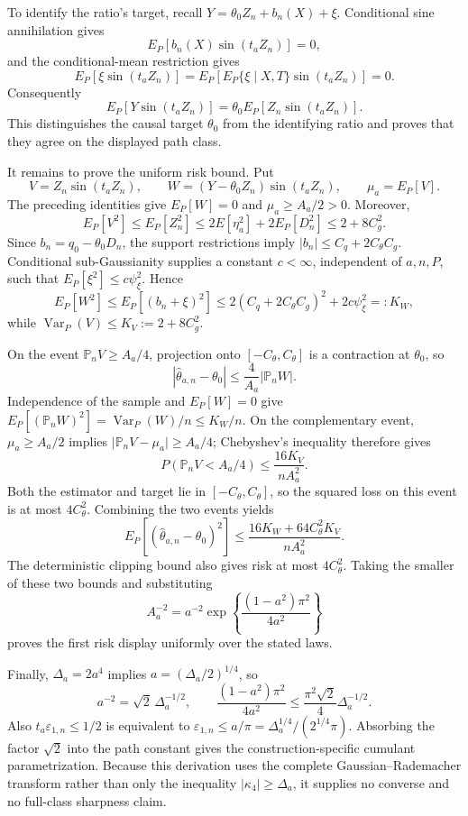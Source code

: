 To identify the ratio's target, recall \(Y=\theta_0Z_n+b_n(X)+\xi\).  Conditional sine annihilation gives
\[
 E_P[b_n(X)\sin(t_aZ_n)]=0,
\]
and the conditional-mean restriction gives
\[
 E_P[\xi\sin(t_aZ_n)]
 =E_P[E_P\{\xi\mid X,T\}\sin(t_aZ_n)]=0.
\]
Consequently
\[
 E_P[Y\sin(t_aZ_n)]
 =\theta_0E_P[Z_n\sin(t_aZ_n)].
\]
This distinguishes the causal target \(\theta_0\) from the identifying ratio and proves that they agree on the displayed path class.

It remains to prove the uniform risk bound.  Put
\[
 V=Z_n\sin(t_aZ_n),
 \qquad
 W=(Y-\theta_0Z_n)\sin(t_aZ_n),
 \qquad
 \mu_a=E_P[V].
\]
The preceding identities give \(E_P[W]=0\) and \(\mu_a\ge A_a/2>0\).  Moreover,
\[
 E_P[V^2]\le E_P[Z_n^2]
 \le2E[\eta_a^2]+2E_P[D_n^2]
 \le2+8C_g^2.
\]
Since \(b_n=q_0-\theta_0D_n\), the support restrictions imply \(\lvert b_n\rvert\le C_q+2C_{\theta}C_g\).  Conditional sub-Gaussianity supplies a constant \(c<\infty\), independent of \(a,n,P\), such that \(E_P[\xi^2]\le c\psi_{\xi}^2\).  Hence
\[
 E_P[W^2]
 \le E_P[(b_n+\xi)^2]
 \le2(C_q+2C_{\theta}C_g)^2+2c\psi_{\xi}^2=:K_W,
\]
while \(\operatorname{Var}_P(V)\le K_V:=2+8C_g^2\).

On the event \(\mathbb P_nV\ge A_a/4\), projection onto \([-C_{\theta},C_{\theta}]\) is a contraction at \(\theta_0\), so
\[
 \left|\widehat\theta_{a,n}-\theta_0\right|
 \le\frac{4}{A_a}\left|\mathbb P_nW\right|.
\]
Independence of the sample and \(E_P[W]=0\) give \(E_P[(\mathbb P_nW)^2]=\operatorname{Var}_P(W)/n\le K_W/n\).  On the complementary event, \(\mu_a\ge A_a/2\) implies \(\lvert\mathbb P_nV-\mu_a\rvert\ge A_a/4\); Chebyshev's inequality therefore gives
\[
 P\!\left(\mathbb P_nV<A_a/4\right)
 \le\frac{16K_V}{nA_a^2}.
\]
Both the estimator and target lie in \([-C_{\theta},C_{\theta}]\), so the squared loss on this event is at most \(4C_{\theta}^2\).  Combining the two events yields
\[
 E_P[(\widehat\theta_{a,n}-\theta_0)^2]
 \le\frac{16K_W+64C_{\theta}^2K_V}{nA_a^2}.
\]
The deterministic clipping bound also gives risk at most \(4C_{\theta}^2\).  Taking the smaller of these two bounds and substituting
\[
 A_a^{-2}
 =a^{-2}\exp\!\left\{\frac{(1-a^2)\pi^2}{4a^2}\right\}
\]
proves the first risk display uniformly over the stated laws.

Finally, \(\Delta_a=2a^4\) implies \(a=(\Delta_a/2)^{1/4}\), so
\[
 a^{-2}=\sqrt2\,\Delta_a^{-1/2},
 \qquad
 \frac{(1-a^2)\pi^2}{4a^2}
 \le\frac{\pi^2\sqrt2}{4}\Delta_a^{-1/2}.
\]
Also \(t_a\varepsilon_{1,n}\le1/2\) is equivalent to \(\varepsilon_{1,n}\le a/\pi=\Delta_a^{1/4}/(2^{1/4}\pi)\).  Absorbing the factor \(\sqrt2\) into the path constant gives the construction-specific cumulant parametrization.  Because this derivation uses the complete Gaussian--Rademacher transform rather than only the inequality \(\lvert\kappa_4\rvert\ge\Delta_a\), it supplies no converse and no full-class sharpness claim.